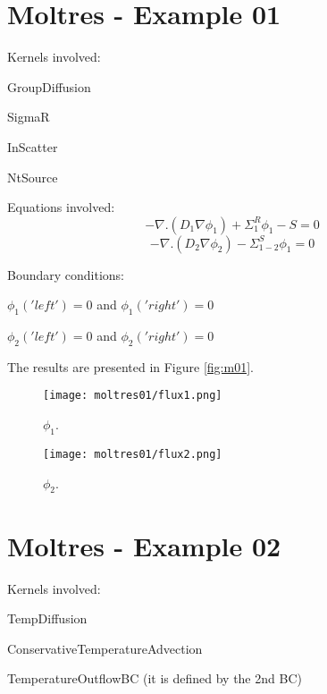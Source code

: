 \documentclass[11pt,letterpaper]{article}
\begin{document}
\newpage
\section{Moltres - Example 01}

Kernels involved:
\begin{description}[font=$\bullet$\scshape\bfseries]
	\item[] GroupDiffusion
	\item[] SigmaR
	\item[] InScatter
	\item[] NtSource
\end{description}

Equations involved:
\begin{equation}
-\nabla.(D_{1}\nabla\phi_{1})+\Sigma^{R}_{1}\phi_{1}-S=0
\end{equation}
\begin{equation}
-\nabla.(D_{2}\nabla\phi_{2})-\Sigma^{S}_{1-2}\phi_{1}=0
\end{equation}

Boundary conditions:
\begin{description}[]
	\item[] $\phi_{1}('left')=0$ and $\phi_{1}('right')=0$
	\item[] $\phi_{2}('left')=0$ and $\phi_{2}('right')=0$
\end{description}

The results are presented in Figure \ref{fig:m01}.
\begin{figure*}[!h]
	\centering
	\begin{subfigure}[t]{0.4\textwidth}
		\centering
		\texttt{[image: moltres01/flux1.png]} 
		\caption{$\phi_{1}$.}
		\label{fig:m01-flux1}
	\end{subfigure}
	\vspace{1cm}
	\begin{subfigure}[t]{0.4\textwidth}
		\centering
		\texttt{[image: moltres01/flux2.png]} 
		\caption{$\phi_{2}$.}
		\label{fig:m01-flux2}
	\end{subfigure}
	\hfill
	\caption{Flux.}
	\label{fig:m01}
\end{figure*}

\newpage
\section{Moltres - Example 02}

Kernels involved:
\begin{description}[font=$\bullet$\scshape\bfseries]
	\item[] TempDiffusion
	\item[]	ConservativeTemperatureAdvection
	\item[] TemperatureOutflowBC (it is defined by the 2nd BC)
\end{description}
\end{document}
